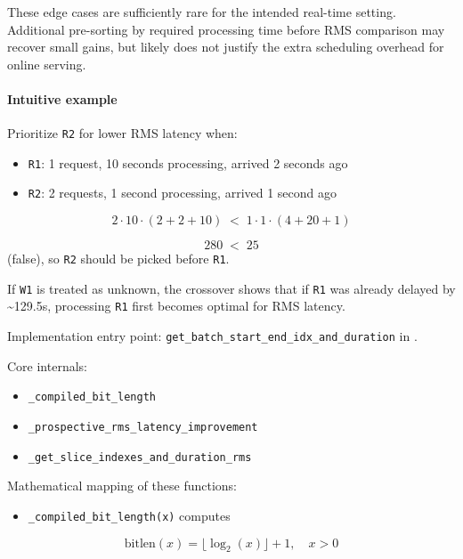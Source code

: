 \documentclass{article}
\providecommand{\tightlist}{\setlength{\itemsep}{0pt}\setlength{\parskip}{0pt}}
\begin{document}
These edge cases are sufficiently rare for the intended real-time
setting. Additional pre-sorting by required processing time before RMS
comparison may recover small gains, but likely does not justify the
extra scheduling overhead for online serving.

\hypertarget{intuitive-example}{%
\paragraph{Intuitive example}\label{intuitive-example}}

Prioritize \texttt{R2} for lower RMS latency when:

\begin{itemize}
\tightlist
\item
  \texttt{R1}: 1 request, 10 seconds processing, arrived 2 seconds ago
\item
  \texttt{R2}: 2 requests, 1 second processing, arrived 1 second ago
\end{itemize}

\[
2 \cdot 10 \cdot (2 + 2 + 10) \;<\; 1 \cdot 1 \cdot (4 + 20 + 1)
\]

\[
280 \;<\; 25
\]
(false), so \texttt{R2} should be picked
before \texttt{R1}.

If \texttt{W1} is treated as unknown, the crossover shows that if
\texttt{R1} was already delayed by \textasciitilde129.5s, processing
\texttt{R1} first becomes optimal for RMS latency.

Implementation entry point:
\texttt{get\_batch\_start\_end\_idx\_and\_duration} in
.

Core internals:

\begin{itemize}
\tightlist
\item
  \texttt{\_compiled\_bit\_length}
\item
  \texttt{\_prospective\_rms\_latency\_improvement}
\item
  \texttt{\_get\_slice\_indexes\_and\_duration\_rms}
\end{itemize}

Mathematical mapping of these functions:

\begin{itemize}
\tightlist
\item
  \texttt{\_compiled\_bit\_length(x)} computes
\end{itemize}

\[
\mathrm{bitlen}(x)=\lfloor \log_2(x)\rfloor + 1,\quad x>0
\]
\end{document}
